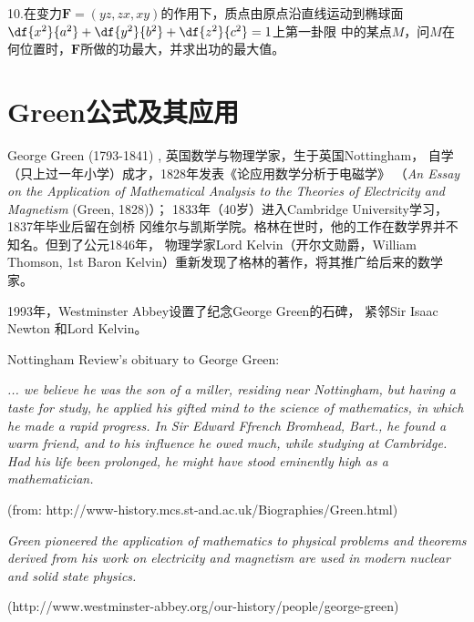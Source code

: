 10.\;在变力$\bm{F}=(yz,zx,xy)$的作用下，质点由原点沿直线运动到椭球面
$\df{x^2}{a^2}+\df{y^2}{b^2}+\df{z^2}{c^2}=1$上第一卦限
中的某点$M$，问$M$在何位置时，$\bm{F}$所做的功最大，并求出功的最大值。


\newpage


\ifvisible

\setcounter{section}{1}

\section{Green公式及其应用}

\begin{shaded}
	George Green (1793-1841) , 英国数学与物理学家，生于英国Nottingham，
	自学（只上过一年小学）成才，1828年发表《论应用数学分析于电磁学》
	（{\it An Essay on the Application of Mathematical Analysis to 
	the Theories of Electricity and Magnetism }(Green, 1828)）；
	1833年（40岁）进入Cambridge University学习，1837年毕业后留在剑桥
	冈维尔与凯斯学院。格林在世时，他的工作在数学界并不知名。但到了公元1846年，
	物理学家Lord Kelvin（开尔文勋爵，William Thomson, 1st Baron 
	Kelvin）重新发现了格林的著作，将其推广给后来的数学家。
	
	\bigskip

	1993年，Westminster Abbey设置了纪念George Green的石碑，
	紧邻Sir Isaac Newton 和Lord Kelvin。
	
	\bigskip
	
	Nottingham Review's obituary to George Green:
	
	{\it ... we believe he was the son of a miller, residing near 
	Nottingham, but having a taste for study, he applied his 
	gifted mind to the science of mathematics, in which he 
	made a rapid progress. In Sir Edward Ffrench Bromhead, 
	Bart., he found a warm friend, and to his influence he 
	owed much, while studying at Cambridge. Had his life been 
	prolonged, he might have stood eminently high as a mathematician.}
	
	\hfill (from: http://www-history.mcs.st-and.ac.uk/Biographies/Green.html)
	
	\bigskip
	
	{\it Green pioneered the application of mathematics to physical 
	problems and theorems derived from his work on electricity 
	and magnetism are used in modern nuclear and solid state physics.}
	
	\hfill (http://www.westminster-abbey.org/our-history/people/george-green)
	

\end{shaded}
